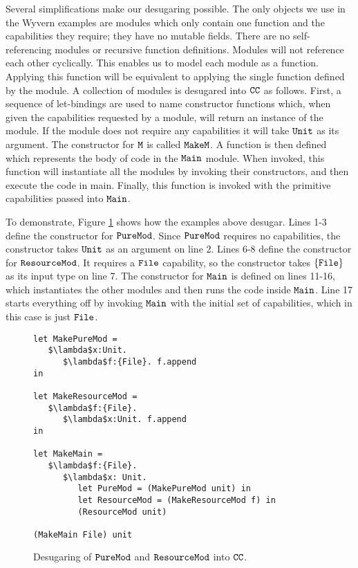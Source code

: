 Several simplifications make our desugaring possible. The only objects we use in the Wyvern examples are modules which only contain one function and the capabilities they require; they have no mutable fields. There are no self-referencing modules or recursive function definitions. Modules will not reference each other cyclically. This enables us to model each module as a function. Applying this function will be equivalent to applying the single function defined by the module. A collection of modules is desugared into $\mathtt{CC}$ as follows. First, a sequence of let-bindings are used to name constructor functions which, when given the capabilities requested by a module, will return an instance of the module. If the module does not require any capabilities it will take $\mathtt{Unit}$ as its argument. The constructor for $\mathtt{M}$ is called $\mathtt{MakeM}$. A function is then defined which represents the body of code in the $\mathtt{Main}$ module. When invoked, this function will instantiate all the modules by invoking their constructors, and then execute the code in main. Finally, this function is invoked with the primitive capabilities passed into $\mathtt{Main}$.

To demonstrate, Figure \ref{fig:wyv_tutorial_desugaring} shows how the examples above desugar. Lines 1-3 define the constructor for $\mathtt{PureMod}$. Since $\mathtt{PureMod}$ requires no capabilities, the constructor takes $\mathtt{Unit}$ as an argument on line 2. Lines 6-8 define the constructor for $\mathtt{ResourceMod}$. It requires a $\mathtt{File}$ capability, so the constructor takes $\mathtt{\{File\}}$ as its input type on line 7. The constructor for $\mathtt{Main}$ is defined on lines 11-16, which instantiates the other modules and then runs the code inside $\mathtt{Main}$. Line 17 starts everything off by invoking $\mathtt{Main}$ with the initial set of capabilities, which in this case is just $\mathtt{File}$.

\begin{figure}[h]

\begin{lstlisting}
let MakePureMod =
   $\lambda$x:Unit.
      $\lambda$f:{File}. f.append
in

let MakeResourceMod =
   $\lambda$f:{File}.
      $\lambda$x:Unit. f.append
in

let MakeMain =
   $\lambda$f:{File}.
      $\lambda$x: Unit.
         let PureMod = (MakePureMod unit) in
         let ResourceMod = (MakeResourceMod f) in
         (ResourceMod unit)

(MakeMain File) unit
\end{lstlisting}

\caption{Desugaring of $\mathtt{PureMod}$ and $\mathtt{ResourceMod}$ into $\mathtt{CC}$.}
\label{fig:wyv_tutorial_desugaring}
\end{figure}

